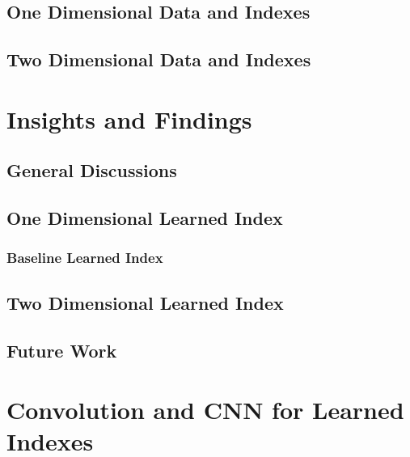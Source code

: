 \documentclass[a4paper,12pt]{scrreprt}
\begin{document}
\section{One Dimensional Data and Indexes}



\section{Two Dimensional Data and Indexes}



\chapter{Insights and Findings}

\section{General Discussions}



\section{One Dimensional Learned Index}

\subsection{Baseline Learned Index}



\section{Two Dimensional Learned Index}



\section{Future Work}

\chapter{Convolution and CNN for Learned Indexes}


\end{document}
